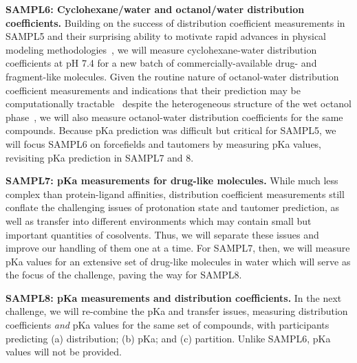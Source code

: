 \documentclass[11pt]{article}
\begin{document}
{\bf SAMPL6: Cyclohexane/water and octanol/water distribution coefficients.}
Building on the success of distribution coefficient measurements in SAMPL5 and their surprising ability to motivate rapid advances in physical modeling methodologies~\cite{bannan_blind_2016}, we will measure cyclohexane-water distribution coefficients at pH 7.4 for a new batch of commercially-available drug- and fragment-like molecules.
Given the routine nature of octanol-water distribution coefficient measurements and indications that their prediction may be computationally tractable~\cite{Bhatnagar:2013:PhysicalChemistryChemicalPhysics, bannan_calculating_2016} despite the heterogeneous structure of the wet octanol phase~\cite{Kollman:1996:AccountsofChemicalResearch}, we will also measure octanol-water distribution coefficients for the same compounds.
Because pKa prediction was difficult but critical for SAMPL5, we will focus SAMPL6 on forcefields and tautomers by measuring pKa values, revisiting pKa prediction in SAMPL7 and 8.

{\bf SAMPL7: pKa measurements for drug-like molecules.} 
While much less complex than protein-ligand affinities, distribution coefficient measurements still conflate the challenging issues of protonation state and tautomer prediction, as well as transfer into different environments which may contain small but important quantities of cosolvents. 
Thus, we will separate these issues and improve our handling of them one at a time. 
For SAMPL7, then, we will measure pKa values for an extensive set of drug-like molecules in water which will serve as the focus of the challenge, paving the way for SAMPL8.

{\bf SAMPL8: pKa measurements and distribution coefficients.}
In the next challenge, we will re-combine the pKa and transfer issues, measuring distribution coefficients \emph{and} pKa values for the same set of compounds, with participants predicting (a) distribution; (b) pKa; and (c) partition. 
Unlike SAMPL6, pKa values will not be provided.
\end{document}
